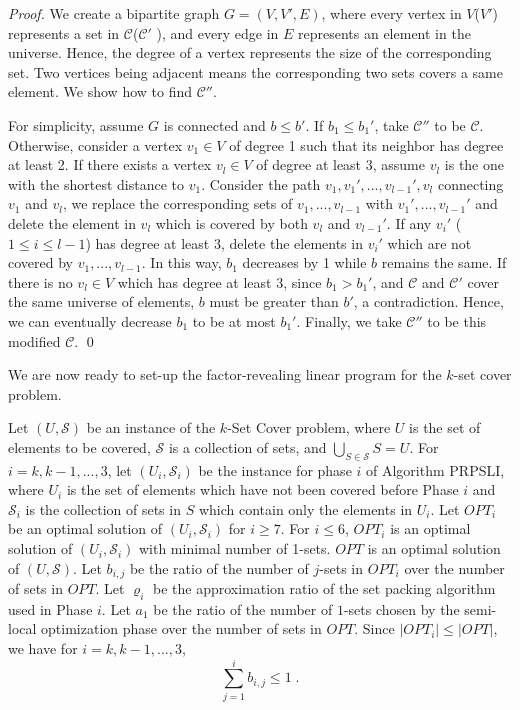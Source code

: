 \documentclass[runningheads,a4paper]{llncs}
\numberwithin{equation}{section}
\begin{document}
\begin{proof}
We create a bipartite graph $G=(V, V', E)$, where every vertex in $V$($V'$) represents a set in $\mathscr{C}$($\mathscr{C}'$ ), and every edge in $E$ represents an element in the universe. Hence, the degree of a vertex represents the size of the corresponding set. Two vertices being adjacent means the corresponding two sets covers a same element. We show how to find $\mathscr{C}''$.
 
For simplicity, assume $G$ is connected and $b\leq b'$. If $b_1\leq b_1'$, take $\mathscr{C}''$ to be $\mathscr{C}$. Otherwise, consider a vertex $v_1\in V$ of degree 1 such that its neighbor has degree at least 2. If there exists a vertex $v_l\in V$ of degree at least 3, assume $v_l$ is the one with the shortest distance to $v_1$. Consider the path $v_1,v_1',...,v_{l-1}',v_l$ connecting $v_1$ and $v_l$, we replace the corresponding sets of $v_1,...,v_{l-1}$ with $v_1',...,v_{l-1}'$ and delete the element in $v_l$ which is covered by both $v_l$ and $v_{l-1}'$. If any $v_i'$ ($1\leq i\leq l-1$) has degree at least 3, delete the elements in $v_i'$ which are not covered by $v_1,...,v_{l-1}$. In this way, $b_1$ decreases by 1 while $b$ remains the same. If there is no $v_l\in V$ which has degree at least 3, since $b_1>b_1'$, and $\mathscr{C}$ and $\mathscr{C}'$ cover the same universe of elements, $b$ must be greater than $b'$, a contradiction. Hence, we can eventually decrease $b_1$ to be at most $b_1'$. Finally, we take $\mathscr{C}''$ to be this modified $\mathscr{C}$. \qed

\end{proof}

We are now ready to set-up the factor-revealing linear program for the $k$-set cover problem.

Let $(U,\mathscr{S})$ be an instance of the $k$-Set Cover problem, where $U$ is the set of elements to be covered, $\mathscr{S}$ is a collection of sets, and $\bigcup_{S\in \mathscr{S}}S=U$. For $i=k,k-1,...,3$, let $(U_i,\mathscr{S}_i)$ be the instance for phase $i$ of Algorithm PRPSLI, where $U_i$ is the set of elements which have not been covered before Phase $i$ and $\mathscr{S}_i$ is the collection of sets in $S$ which contain only the elements in $U_i$. Let $OPT_i$ be an optimal solution of $(U_i,\mathscr{S}_i)$ for $i\geq 7$. For $i\leq 6$, $OPT_i$ is an optimal solution of $(U_i,\mathscr{S}_i)$ with minimal number of 1-sets. $OPT$ is an optimal solution of $(U,\mathscr{S})$. Let $b_{i,j}$ be the ratio of the number of $j$-sets in $OPT_i$ over the number of sets in $OPT$. Let $\varrho_i$ be the approximation ratio of the set packing algorithm used in Phase $i$. Let $a_1$ be the ratio of the number of $1$-sets chosen by the semi-local optimization phase over the number of sets in $OPT$. Since $|OPT_i|\leq |OPT|$, we have for $i=k,k-1,...,3$,
\begin{equation}
\sum_{j=1}^i b_{i,j}\leq 1 \; .
\end{equation}
\end{document}
